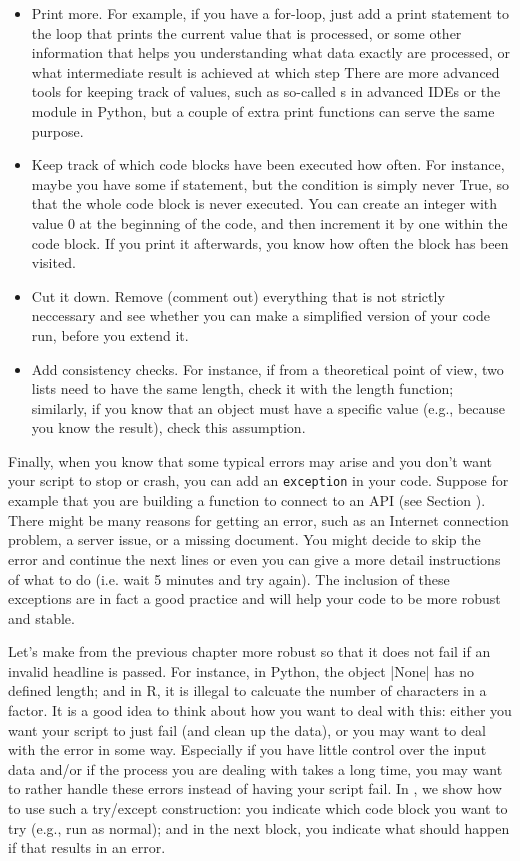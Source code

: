 \begin{itemize}
  \item Print more. For example, if you have a for-loop, just add a print statement to the loop that prints the current value that is processed, or some other information that helps you understanding what data exactly are processed, or what intermediate result is achieved at which step There are more advanced tools for keeping track of values, such as so-called s in advanced IDEs or the  module in Python, but a couple of extra print functions can serve the same purpose.
  \item Keep track of which code blocks have been executed how often. For instance, maybe you have some if statement, but the condition is simply never True, so that the whole code block is never executed. You can create an integer with value 0 at the beginning of the code, and then increment it by one within the code block. If you print it afterwards, you know how often the block has been visited.
  \item Cut it down. Remove (comment out) everything that is not strictly neccessary and see whether you can make a simplified version of your code run, before you extend it.
  \item Add consistency checks. For instance, if from a theoretical point of view, two lists need to have the same length, check it with the length function; similarly, if you know that an object must have a specific value (e.g., because you know the result), check this assumption.
\end{itemize}


Finally, when you know that some typical errors may arise and you don't want your script to stop or crash, you can add an \texttt{exception} in your code. Suppose for example that you are building a function to connect to an API (see Section ). There might be many reasons for getting an error, such as an Internet connection problem, a server issue, or a missing document. You might decide to skip  the error and continue the next lines or even you can give a more detail instructions of what to do (i.e. wait 5 minutes and try again). The inclusion of these exceptions are in fact a good practice and will help your code to be more robust and stable.

Let's make  from the previous chapter more robust so that it does not fail if an invalid headline is passed. For instance, in Python, the object |None| has no defined length; and in R, it is illegal to calcuate the number of characters in a factor. It is a good idea to think about how you want to deal with this: either you want your script to just fail (and clean up the data), or you may want to deal with the error in some way. Especially if you have little control over the input data and/or if the process you are dealing with takes a long time, you may want to rather handle these errors instead of having your script fail. In , we show how to use such a try/except construction: you indicate which code block you want to try (e.g., run as normal); and in the next block, you indicate what should happen if that results in an error.

